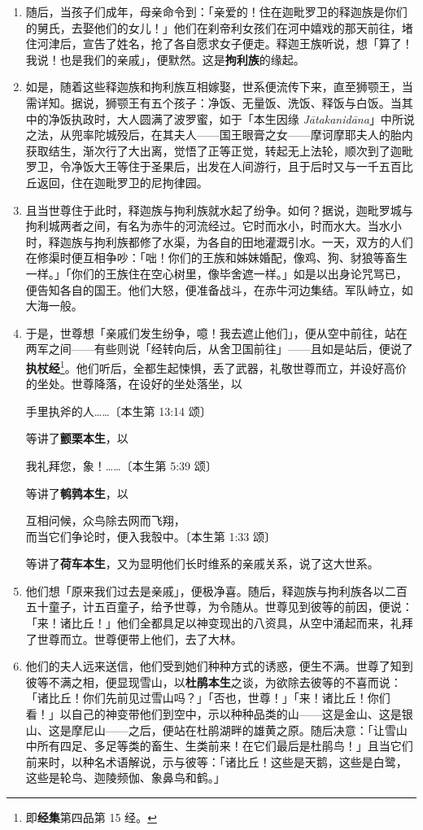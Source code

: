 \begin{enumerate}
\item 随后，当孩子们成年，母亲命令到：「亲爱的！住在迦毗罗卫的释迦族是你们的舅氏，去娶他们的女儿！」他们在刹帝利女孩们在河中嬉戏的那天前往，堵住河津后，宣告了姓名，抢了各自愿求女子便走。释迦王族听说，想「算了！我说！也是我们的亲戚」，便默然。这是\textbf{拘利族}的缘起。
\item 如是，随着这些释迦族和拘利族互相嫁娶，世系便流传下来，直至狮颚王，当需详知。据说，狮颚王有五个孩子：净饭、无量饭、洗饭、释饭与白饭。当其中的净饭执政时，大人圆满了波罗蜜，如于「本生因缘 \textit{Jātakanidāna}」中所说之法，从兜率陀城殁后，在其夫人——国王眼膏之女——摩诃摩耶夫人的胎内获取结生，渐次行了大出离，觉悟了正等正觉，转起无上法轮，顺次到了迦毗罗卫，令净饭大王等住于圣果后，出发在人间游行，且于后时又与一千五百比丘返回，住在迦毗罗卫的尼拘律园。
\item 且当世尊住于此时，释迦族与拘利族就水起了纷争。如何？据说，迦毗罗城与拘利城两者之间，有名为赤牛的河流经过。它时而水小，时而水大。当水小时，释迦族与拘利族都修了水渠，为各自的田地灌溉引水。一天，双方的人们在修渠时便互相争吵：「咄！你们的王族和姊妹婚配，像鸡、狗、豺狼等畜生一样。」「你们的王族住在空心树里，像毕舍遮一样。」如是以出身论咒骂已，便告知各自的国王。他们大怒，便准备战斗，在赤牛河边集结。军队峙立，如大海一般。
\item 于是，世尊想「亲戚们发生纷争，噫！我去遮止他们」，便从空中前往，站在两军之间——有些则说「经转向后，从舍卫国前往」——且如是站后，便说了\textbf{执杖经}\footnote{即\textbf{经集}第四品第 15 经。}。他们听后，全都生起悚惧，丢了武器，礼敬世尊而立，并设好高价的坐处。世尊降落，在设好的坐处落坐，以\begin{quoting}手里执斧的人……{\bluefootnotesize 〔本生第 13:14 颂〕}\end{quoting}等讲了\textbf{颤栗本生}，以\begin{quoting}我礼拜您，象！……{\bluefootnotesize 〔本生第 5:39 颂〕}\end{quoting}等讲了\textbf{鹌鹑本生}，以\begin{quoting}互相问候，众鸟除去网而飞翔，\\而当它们争论时，便入我彀中。{\bluefootnotesize 〔本生第 1:33 颂〕}\end{quoting}等讲了\textbf{荷车本生}，又为显明他们长时维系的亲戚关系，说了这大世系。
\item 他们想「原来我们过去是亲戚」，便极净喜。随后，释迦族与拘利族各以二百五十童子，计五百童子，给予世尊，为令随从。世尊见到彼等的前因，便说：「来！诸比丘！」他们全都具足以神变现出的八资具，从空中涌起而来，礼拜了世尊而立。世尊便带上他们，去了大林。
\item 他们的夫人远来送信，他们受到她们种种方式的诱惑，便生不满。世尊了知到彼等不满之相，便显现雪山，以\textbf{杜鹃本生}之谈，为欲除去彼等的不喜而说：「诸比丘！你们先前见过雪山吗？」「否也，世尊！」「来！诸比丘！你们看！」以自己的神变带他们到空中，示以种种品类的山——这是金山、这是银山、这是摩尼山——之后，便站在杜鹃湖畔的雄黄之原。随后决意：「让雪山中所有四足、多足等类的畜生、生类前来！在它们最后是杜鹃鸟！」且当它们前来时，以种名术语解说，示与彼等：「诸比丘！这些是天鹅，这些是白鹭，这些是轮鸟、迦陵频伽、象鼻鸟和鹤。」

\end{enumerate}
